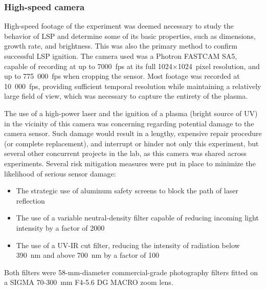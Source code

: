             \subsubsection*{High-speed camera}
                High-speed footage of the experiment was deemed necessary to study the behavior of LSP and determine some of its basic properties, such as dimensions, growth rate, and brightness. This was also the primary method to confirm successful LSP ignition. The camera used was a Photron FASTCAM SA5, capable of recording at up to 7000~fps at its full 1024$\times$1024~pixel resolution, and up to 775~000~fps when cropping the sensor. Most footage was recorded at 10~000~fps, providing sufficient temporal resolution while maintaining a relatively large field of view, which was necessary to capture the entirety of the plasma.

                The use of a high-power laser and the ignition of a plasma (bright source of UV) in the vicinity of this camera was concerning regarding potential damage to the camera sensor. Such damage would result in a lengthy, expensive repair procedure (or complete replacement), and interrupt or hinder not only this experiment, but several other concurrent projects in the lab, as this camera was shared across experiments. Several risk mitigation measures were put in place to minimize the likelihood of serious sensor damage:
                \begin{itemize}
                    \item The strategic use of aluminum safety screens to block the path of laser reflection
                    \item The use of a variable neutral-density filter capable of reducing incoming light intensity by a factor of 2000
                    \item The use of a UV-IR cut filter, reducing the intensity of radiation below 390~nm and above 700~nm by a factor of 100
                \end{itemize}
                Both filters were 58-mm-diameter commercial-grade photography filters fitted on a SIGMA 70-300~mm F4-5.6 DG MACRO zoom lens. 

                


